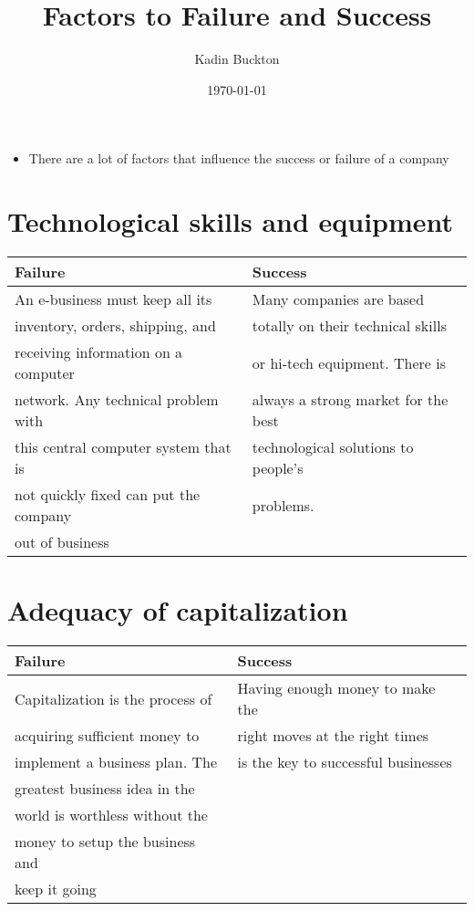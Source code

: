 \documentclass[11pt]{article}
\author{Kadin Buckton}
\date{\today}
\title{Factors to Failure and Success}
\begin{document}
\maketitle
\tableofcontents

\begin{itemize}
\item There are a lot of factors that influence the success or failure of a company
\end{itemize}

\section{Technological skills and equipment}
\label{sec:orgc98fa76}

\begin{center}
\begin{tabular}{ll}
Failure & Success\\
\hline
An e-business must keep all its & Many companies are based\\
inventory, orders, shipping, and & totally on their technical skills\\
receiving information on a computer & or hi-tech equipment. There is\\
network. Any technical problem with & always a strong market for the best\\
this central computer system that is & technological solutions to people's\\
not quickly fixed can put the company & problems.\\
out of business & \\
\end{tabular}
\end{center}

\section{Adequacy of capitalization}
\label{sec:orgd1acc90}

\begin{center}
\begin{tabular}{ll}
Failure & Success\\
\hline
Capitalization is the process of & Having enough money to make the\\
acquiring sufficient money to & right moves at the right times\\
implement a business plan. The & is the key to successful businesses\\
greatest business idea in the & \\
world is worthless without the & \\
money to setup the business and & \\
keep it going & \\
\end{tabular}
\end{center}
\end{document}
